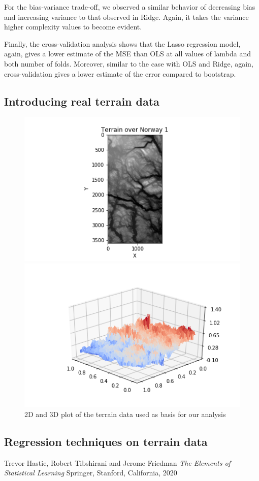 \documentclass{article}
\begin{document}
For the bias-variance trade-off, we observed a similar behavior of decreasing bias and increasing variance to that observed in Ridge. Again, it takes the variance higher complexity values to become evident.

Finally, the cross-validation analysis shows that the Lasso regression model, again, gives a lower estimate of the MSE than OLS at all values of lambda and both number of folds. Moreover, similar to the case with OLS and Ridge, again, cross-validation gives a lower estimate of the error compared to bootstrap.


\subsection{Introducing real terrain data}
\begin{figure}
\begin{minipage}{0.48\textwidth}
\centering
\includegraphics[width=1.5\linewidth]{terrain2dplot.png}
\end{minipage}
\begin{minipage}{\textwidth}

\includegraphics[width=0.7\linewidth]{rawdataplot.png}
\end{minipage}
\caption{2D and 3D plot of the terrain data used as basis for our analysis}
\end{figure}

\subsection{Regression techniques on terrain data}

\medskip

\begin{thebibliography}{9}
Trevor Hastie, Robert Tibshirani and Jerome Friedman
\textit{The Elements of Statistical Learning}
Springer, Stanford, California, 2020
\end{thebibliography}
\end{document}
